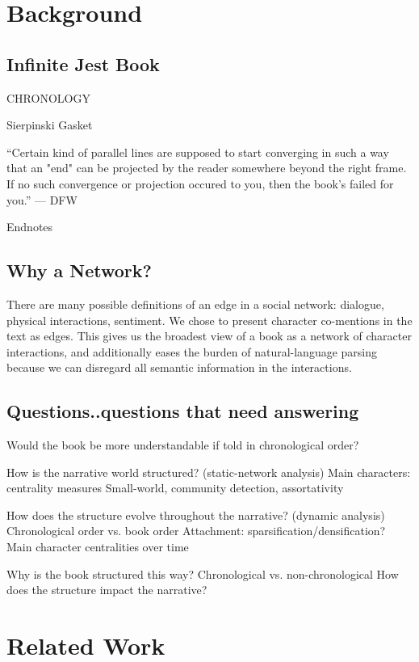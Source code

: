 \documentclass[sigconf]{acmart}
\begin{document}
\section{Background}

\subsection{Infinite Jest Book}

CHRONOLOGY

Sierpinski Gasket

“Certain kind of parallel lines are supposed to start converging in such a way that an "end" can be projected by the reader somewhere beyond the right frame. If no such convergence or projection occured to you, then the book's failed for you.” — DFW

Endnotes

\subsection{Why a Network?}

There are many possible definitions of an edge in a social network: dialogue, physical interactions, sentiment. 
We chose to present character co-mentions in the text as edges. 
This gives us the broadest view of a book as a network of character interactions, and additionally eases the burden of natural-language parsing because we can disregard all semantic information in the interactions.

\subsection{Questions..questions that need answering}

Would the book be more understandable if told in chronological order?

How is the narrative world structured? (static-network analysis)
Main characters: centrality measures
Small-world, community detection, assortativity


How does the structure evolve throughout the narrative? (dynamic analysis)
Chronological order vs. book order
Attachment: sparsification/densification?
Main character centralities over time


Why is the book structured this way?
Chronological vs. non-chronological
How does the structure impact the narrative?


\section{Related Work}
\end{document}
